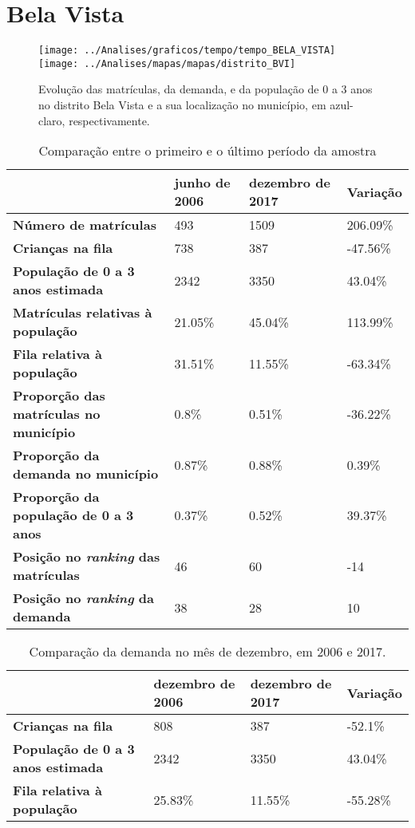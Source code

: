 \section{Bela Vista}
\begin{figure}[H]
\centering
\texttt{[image: ../Analises/graficos/tempo/tempo\_BELA\_VISTA]}
\texttt{[image: ../Analises/mapas/mapas/distrito\_BVI]}
\caption{Evolução das matrículas, da demanda, e da população de 0 a 3 anos no distrito Bela Vista e a sua localização no município, em azul-claro, respectivamente.}
\end{figure}
\begin{table}[H]
\begin{tabular}{l|l|l|l}
\textbf{}                                      & \textbf{junho de 2006}       & \textbf{dezembro de 2017}    & \textbf{Variação} \\ \hline
\textbf{Número de matrículas}                  & 493 & 1509 & 206.09\% \\ \hline
\textbf{Crianças na fila}                      & 738 & 387 & -47.56\% \\ \hline
\textbf{População de 0 a 3 anos estimada}      & 2342 & 3350 & 43.04\% \\ \hline
\textbf{Matrículas relativas à população}      & 21.05\% & 45.04\% & 113.99\% \\ \hline
\textbf{Fila relativa à população}             & 31.51\% & 11.55\% & -63.34\% \\ \hline
\textbf{Proporção das matrículas no município} & 0.8\% & 0.51\% & -36.22\% \\ \hline
\textbf{Proporção da demanda no município}     & 0.87\% & 0.88\% & 0.39\% \\ \hline
\textbf{Proporção da população de 0 a 3 anos}  & 0.37\% & 0.52\% & 39.37\% \\ \hline
\textbf{Posição no \textit{ranking} das matrículas}     & 46 & 60 & -14 \\ \hline
\textbf{Posição no \textit{ranking} da demanda}         & 38 & 28 & 10 \\ 
\end{tabular}
\caption{Comparação entre o primeiro e o último período da amostra}
\end{table}
\begin{table}[H]
\begin{tabular}{l|l|l|l}
\textbf{}                                 & \textbf{dezembro de 2006} & \textbf{dezembro de 2017} & \textbf{Variação} \\ \hline
\textbf{Crianças na fila}                      & 808 & 387 & -52.1\% \\ \hline
\textbf{População de 0 a 3 anos estimada}      & 2342 & 3350 & 43.04\% \\ \hline
\textbf{Fila relativa à população}             & 25.83\% & 11.55\% & -55.28\% \\
\end{tabular}
\caption{Comparação da demanda no mês de dezembro, em 2006 e 2017.}
\end{table}
